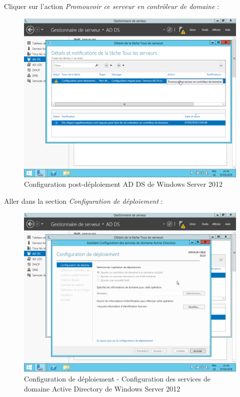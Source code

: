 \newpage
Cliquer sur l'action \textit{Promouvoir ce serveur en contrôleur de domaine} :
\begin{figure}[h!]
    \begin{center}
        \includegraphics[scale=0.6]{WS2012_Screenshots/55.png}
        \caption{Configuration post-déploiement AD DS de Windows Server 2012}
        \label{WS2012_Screenshots/55}
    \end{center}
\end{figure}
\FloatBarrier

\newpage
Aller dans la section \textit{Configuration de déploiement} :
\begin{figure}[h!]
    \begin{center}
        \includegraphics[scale=0.6]{WS2012_Screenshots/56.png}
        \caption{Configuration de déploiement - Configuration des services de domaine Active Directory de Windows Server 2012}
        \label{WS2012_Screenshots/56}
    \end{center}
\end{figure}
\FloatBarrier

